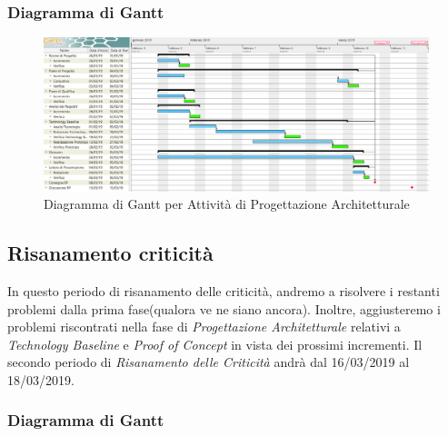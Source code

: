 \begin{landscape}
\subsubsection{Diagramma di Gantt}
\begin{figure}[h]
	\centering
  		\includegraphics[width=1.0\linewidth]{./images/ProgettazioneArchitetturale.png}
  		\caption{Diagramma di Gantt per Attività di Progettazione Architetturale}
  		\label{fig:Gantt Progettazione Architetturale}
\end{figure}
\end{landscape}

\subsection{Risanamento criticità}
In questo periodo di risanamento delle criticità, andremo a risolvere i restanti problemi dalla prima fase(qualora ve ne siano ancora). Inoltre, aggiusteremo i problemi riscontrati nella fase di \textit{Progettazione Architetturale} relativi a \textit{Technology Baseline} e \textit{Proof of Concept} in vista dei prossimi incrementi.
Il secondo periodo di \textit{Risanamento delle Criticità} andrà dal 16/03/2019 al 18/03/2019.

\subsubsection{Diagramma di Gantt}

